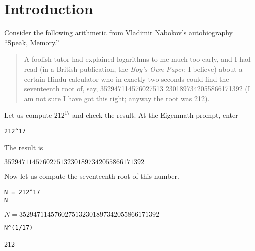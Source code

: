 \section{Introduction}

\noindent
Consider the following arithmetic from Vladimir Nabokov's autobiography ``Speak, Memory.''

\begin{quote}
A foolish tutor had explained logarithms to me much too early, and I had
read (in a British publication, the {\it Boy's Own Paper}, I believe)
about a certain Hindu calculator who in exactly two seconds could find the
seventeenth root of, say,
352947114576027513 2301897342055866171392
(I am not sure I have got this right; anyway the root was 212).
\end{quote}

\noindent
Let us compute $212^{17}$ and check the result.
At the Eigenmath prompt, enter

{\color{blue}
\begin{verbatim}
212^17
\end{verbatim}
}

\noindent
The result is

\bigskip
\noindent
$3529471145760275132301897342055866171392$

\bigskip
\noindent
Now let us compute the seventeenth root of this number.
{\color{blue}
\begin{verbatim}
N = 212^17
N
\end{verbatim}
}
$N=3529471145760275132301897342055866171392$
{\color{blue}
\begin{verbatim}
N^(1/17)
\end{verbatim}
}
212
